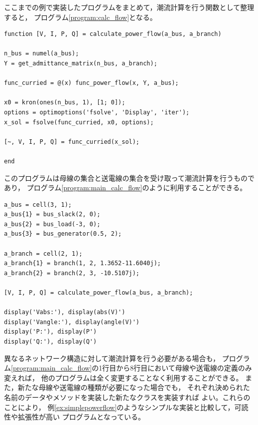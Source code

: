 \documentclass[tombow,dvipdfmx]{corona-a5-1.1}
\begin{document}
\begin{例}[潮流計算の実装結果]
ここまでの例で実装したプログラムをまとめて，潮流計算を行う関数として整理すると，
プログラム\nobreak\ref{program:calc_flow}となる。

\smallskip
\begin{PROGRAMA}[count,title={calculate\_power\_flow.m}]\label{program:calc_flow}
\begin{verbatim}
function [V, I, P, Q] = calculate_power_flow(a_bus, a_branch)

n_bus = numel(a_bus);
Y = get_admittance_matrix(n_bus, a_branch);

func_curried = @(x) func_power_flow(x, Y, a_bus);

x0 = kron(ones(n_bus, 1), [1; 0]);
options = optimoptions('fsolve', 'Display', 'iter');
x_sol = fsolve(func_curried, x0, options);

[~, V, I, P, Q] = func_curried(x_sol);

end
\end{verbatim}
\end{PROGRAMA}
このプログラムは母線の集合と送電線の集合を受け取って潮流計算を行うものであり，
プログラム\nobreak\ref{program:main_calc_flow}のように利用することができる。
\smallskip
\begin{PROGRAMA}[count,title={main\_power\_flow.m}]\label{program:main_calc_flow}
\begin{verbatim}
a_bus = cell(3, 1);
a_bus{1} = bus_slack(2, 0);
a_bus{2} = bus_load(-3, 0);
a_bus{3} = bus_generator(0.5, 2);

a_branch = cell(2, 1);
a_branch{1} = branch(1, 2, 1.3652-11.6040j);
a_branch{2} = branch(2, 3, -10.5107j);

[V, I, P, Q] = calculate_power_flow(a_bus, a_branch);

display('Vabs:'), display(abs(V)')
display('Vangle:'), display(angle(V)')
display('P:'), display(P')
display('Q:'), display(Q')
\end{verbatim}
\end{PROGRAMA}

異なるネットワーク構造に対して潮流計算を行う必要がある場合も，
プログラム\nobreak\ref{program:main_calc_flow}の1行目から8行目において母線や送電線の定義のみ変えれば，
他のプログラムは全く変更することなく利用することができる。
また，新たな母線や送電線の種類が必要になった場合でも，
それぞれ決められた名前のデータやメソッドを実装した新たなクラスを実装すれば
よい。これらのことにより，
例\ref{ex:simplepowerflow}のようなシンプルな実装と比較して，可読性や拡張性が高い
プログラムとなっている。
\end{例}
\end{document}
